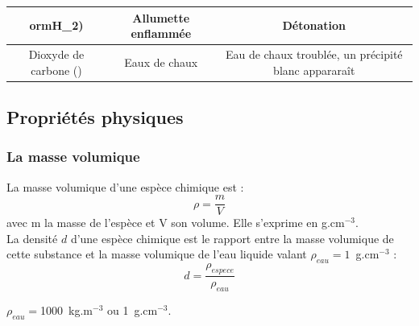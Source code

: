 \begin{tcolorbox}[colback=red!5!white,colframe=red!75!black,title=\textbf{Tests chimiques à connaître : }]
\begin{tabular}{|C{0.31}|C{0.3}|C{0.31}|}
orm{H_2}) & Allumette enflammée  &  Détonation \\
    \hline 
    Dioxyde de carbone () & Eaux de chaux & Eau de chaux troublée, un précipité blanc appararaît \\
    \hline
    \end{tabular}
\end{tcolorbox} 

\subsection{Propriétés physiques}
\subsubsection{La masse volumique}
\begin{tcolorbox}[colback=green!5!white,colframe=green!75!black,title=\textbf{Rappel : masse volumique et densité }]
La masse volumique d'une espèce chimique est :
\begin{equation*}
    \rho = \frac{m}{V}
\end{equation*}
avec m la masse de l'espèce et V son volume. Elle s'exprime en g.cm$^{-3}$.\\
La densité $d$ d'une espèce chimique est le rapport entre la masse volumique de cette substance et la masse volumique de l'eau liquide valant $\rho_{eau}=1$~g.cm$^{-3}$ :
\begin{equation*}
    d = \frac{\rho_{espece}}{\rho_{eau}}
\end{equation*}
\end{tcolorbox}

\begin{tcolorbox}[colback=red!5!white,colframe=red!75!black,title=\textbf{Masse volumique de l'eau: }]
\begin{center}
    $\rho_{eau} = $1000~kg.m$^{-3}$ ou 1~g.cm$^{-3}$. 
\end{center}
\end{tcolorbox}

